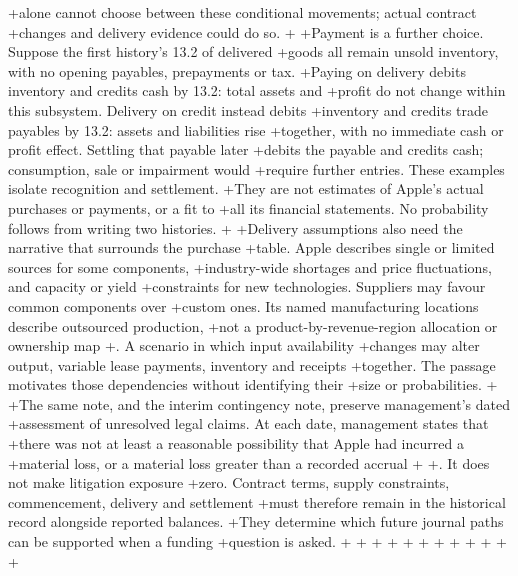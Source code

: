 +alone cannot choose between these conditional movements; actual contract
+changes and delivery evidence could do so.
+
+Payment is a further choice. Suppose the first history's 13.2 of delivered
+goods all remain unsold inventory, with no opening payables, prepayments or tax.
+Paying on delivery debits inventory and credits cash by 13.2: total assets and
+profit do not change within this subsystem. Delivery on credit instead debits
+inventory and credits trade payables by 13.2: assets and liabilities rise
+together, with no immediate cash or profit effect. Settling that payable later
+debits the payable and credits cash; consumption, sale or impairment would
+require further entries. These examples isolate recognition and settlement.
+They are not estimates of Apple's actual purchases or payments, or a fit to
+all its financial statements. No probability follows from writing two histories.
+
+Delivery assumptions also need the narrative that surrounds the purchase
+table. Apple describes single or limited sources for some components,
+industry-wide shortages and price fluctuations, and capacity or yield
+constraints for new technologies. Suppliers may favour common components over
+custom ones. Its named manufacturing locations describe outsourced production,
+not a product-by-revenue-region allocation or ownership map
+\citep[Note 12, printed p.~46]{apple2024}. A scenario in which input availability
+changes may alter output, variable lease payments, inventory and receipts
+together. The passage motivates those dependencies without identifying their
+size or probabilities.
+
+The same note, and the interim contingency note, preserve management's dated
+assessment of unresolved legal claims. At each date, management states that
+there was not at least a reasonable possibility that Apple had incurred a
+material loss, or a material loss greater than a recorded accrual
+\citep[Note 12, printed p.~46]{apple2024}
+\citep[Note 9, printed p.~11]{apple2025q1}. It does not make litigation exposure
+zero. Contract terms, supply constraints, commencement, delivery and settlement
+must therefore remain in the historical record alongside reported balances.
+They determine which future journal paths can be supported when a funding
+question is asked.
+
+
+
+
+
+
+
+
+
+
+
+
